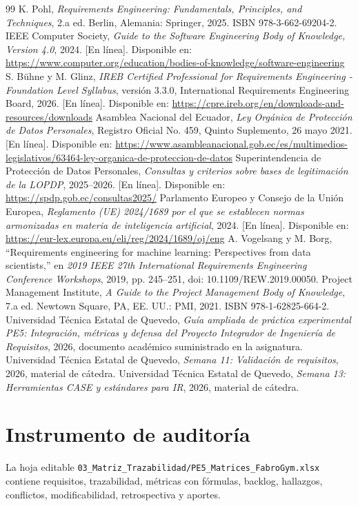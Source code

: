 \documentclass[11pt,a4paper]{article}
\begin{document}
\begin{thebibliography}{99}
 K. Pohl, \emph{Requirements Engineering: Fundamentals, Principles, and Techniques}, 2.a ed. Berlin, Alemania: Springer, 2025. ISBN 978-3-662-69204-2.
 IEEE Computer Society, \emph{Guide to the Software Engineering Body of Knowledge, Version 4.0}, 2024. [En línea]. Disponible en: \url{https://www.computer.org/education/bodies-of-knowledge/software-engineering}
 S. Bühne y M. Glinz, \emph{IREB Certified Professional for Requirements Engineering - Foundation Level Syllabus}, versión 3.3.0, International Requirements Engineering Board, 2026. [En línea]. Disponible en: \url{https://cpre.ireb.org/en/downloads-and-resources/downloads}
 Asamblea Nacional del Ecuador, \emph{Ley Orgánica de Protección de Datos Personales}, Registro Oficial No. 459, Quinto Suplemento, 26 mayo 2021. [En línea]. Disponible en: \url{https://www.asambleanacional.gob.ec/es/multimedios-legislativos/63464-ley-organica-de-proteccion-de-datos}
 Superintendencia de Protección de Datos Personales, \emph{Consultas y criterios sobre bases de legitimación de la LOPDP}, 2025--2026. [En línea]. Disponible en: \url{https://spdp.gob.ec/consultas2025/}
 Parlamento Europeo y Consejo de la Unión Europea, \emph{Reglamento (UE) 2024/1689 por el que se establecen normas armonizadas en materia de inteligencia artificial}, 2024. [En línea]. Disponible en: \url{https://eur-lex.europa.eu/eli/reg/2024/1689/oj/eng}
 A. Vogelsang y M. Borg, “Requirements engineering for machine learning: Perspectives from data scientists,” en \emph{2019 IEEE 27th International Requirements Engineering Conference Workshops}, 2019, pp. 245--251, doi: 10.1109/REW.2019.00050.
 Project Management Institute, \emph{A Guide to the Project Management Body of Knowledge}, 7.a ed. Newtown Square, PA, EE. UU.: PMI, 2021. ISBN 978-1-62825-664-2.
 Universidad Técnica Estatal de Quevedo, \emph{Guía ampliada de práctica experimental PE5: Integración, métricas y defensa del Proyecto Integrador de Ingeniería de Requisitos}, 2026, documento académico suministrado en la asignatura.
 Universidad Técnica Estatal de Quevedo, \emph{Semana 11: Validación de requisitos}, 2026, material de cátedra.
 Universidad Técnica Estatal de Quevedo, \emph{Semana 13: Herramientas CASE y estándares para IR}, 2026, material de cátedra.
\end{thebibliography}


\appendix
\section{Instrumento de auditoría}
La hoja editable \texttt{03\_Matriz\_Trazabilidad/PE5\_Matrices\_FabroGym.xlsx} contiene requisitos, trazabilidad, métricas con fórmulas, backlog, hallazgos, conflictos, modificabilidad, retrospectiva y aportes.

\end{document}
